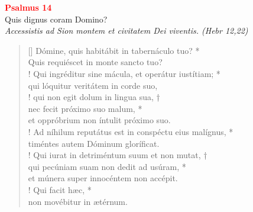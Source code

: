 


\def\greinitialformat#1{%
{\fontsize{39}{39}\selectfont #1}%
}




\vspace{0.3cm}
\begin{center}
 \textcolor{red}{\large \bf Psalmus 14}\\
Quis dignus coram Domino?\\
\textit{\small Accessistis ad Sion montem et civitatem Dei viventis. (Hebr 12,22)}
\end{center}
\begin{verse}[\versewidth]
Dómine, quis habitábit in tabernáculo tuo? *\\
Quis requiéscet in monte sancto tuo?\\!
\vin Qui ingréditur sine mácula, et operátur iustítiam; *\\
\vin qui lóquitur veritátem in corde suo,\\!
qui non egit dolum in lingua sua, †\\
nec fecit próximo suo malum, *\\
et oppróbrium non íntulit próximo suo.\\!
\vin Ad níhilum reputátus est in conspéctu eius malígnus, *\\
\vin timéntes autem Dóminum gloríficat.\\!
Qui iurat in detriméntum suum et non mutat, †\\
qui pecúniam suam non dedit ad usúram, *\\
et múnera super innocéntem non accépit.\\!
\vin Qui facit hæc, *\\
\vin non movébitur in ætérnum.\\
\end{verse}
\vspace{1cm}


